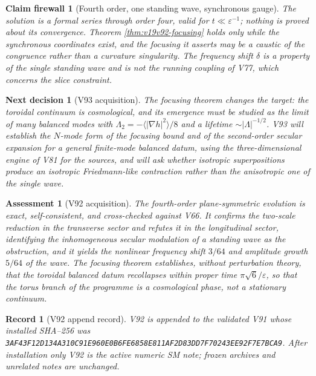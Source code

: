 \documentclass[11pt]{article}
\newtheorem{firewall}[theorem]{Claim firewall}
\newtheorem{decision}[theorem]{Next decision}
\newtheorem{assessment}[theorem]{Assessment}
\newtheorem{record}[theorem]{Record}
\theoremstyle{remark}
\begin{document}
\begin{firewall}[Fourth order, one standing wave, synchronous gauge]
\label{fire:v19v92}
The solution is a formal series through order four, valid for
\(t\ll\varepsilon^{-1}\); nothing is proved about its convergence.
Theorem \ref{thm:v19v92-focusing} holds only while the synchronous
coordinates exist, and the focusing it asserts may be a caustic of
the congruence rather than a curvature singularity.  The frequency
shift \(\delta\) is a property of the single standing wave and is not
the running coupling of V77, which concerns the slice constraint.
\end{firewall}

\begin{decision}[V93 acquisition]
\label{dec:v19v92-next}
The focusing theorem changes the target: the toroidal continuum is
cosmological, and its emergence must be studied as the limit of many
balanced modes with \(\Lambda_2=-\langle|\nabla h|^2\rangle/8\) and a
lifetime \(\sim|\Lambda|^{-1/2}\).  V93 will establish the
\(N\)-mode form of the focusing bound and of the second-order
secular expansion for a general finite-mode balanced datum, using
the three-dimensional engine of V81 for the sources, and will ask
whether isotropic superpositions produce an isotropic
Friedmann-like contraction rather than the anisotropic one of the
single wave.
\end{decision}

\begin{assessment}[V92 acquisition]
\label{ass:v19v92}
The fourth-order plane-symmetric evolution is exact, self-consistent,
and cross-checked against V66.  It confirms the two-scale reduction in
the transverse sector and refutes it in the longitudinal sector,
identifying the inhomogeneous secular modulation of a standing wave
as the obstruction, and it yields the nonlinear frequency shift
\(3/64\) and amplitude growth \(5/64\) of the wave.  The focusing
theorem establishes, without perturbation theory, that the toroidal
balanced datum recollapses within proper time \(\pi\sqrt6/\varepsilon\),
so that the torus branch of the programme is a cosmological phase, not
a stationary continuum.
\end{assessment}

\begin{record}[V92 append record]
\label{rec:v19v92}
V92 is appended to the validated V91 whose installed SHA--256 was
\texttt{3AF43F12D134A310C91E960E0B6FE6858E811AF2D83DD7F70243EE92F7E7BCA9}.
After installation only V92 is the active numeric SM note; frozen
archives and unrelated notes are unchanged.
\end{record}
\end{document}
